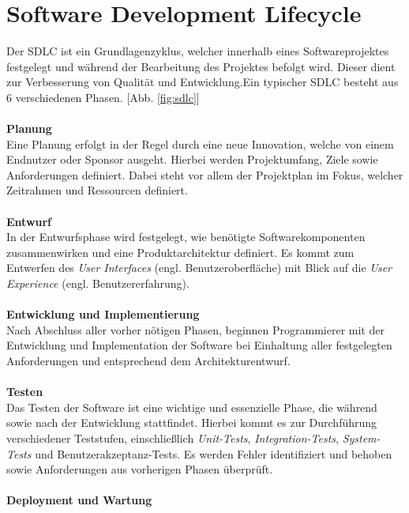 \section{Software Development Lifecycle}
Der SDLC ist ein Grundlagenzyklus, welcher innerhalb eines Softwareprojektes festgelegt und während der Bearbeitung des Projektes befolgt wird. \cite*{SoftwareDevelopmentLife} Dieser dient zur Verbesserung von Qualität und Entwicklung.Ein typischer SDLC besteht aus 6 verschiedenen Phasen. [Abb. \ref{fig:sdlc}]\\\\
\textbf{Planung}\\[0.2cm]
Eine Planung erfolgt in der Regel durch eine neue Innovation, welche von einem Endnutzer oder Sponsor ausgeht. \cite*{tikySoftwareDevelopmentLife} Hierbei werden Projektumfang, Ziele sowie Anforderungen definiert. Dabei steht vor allem der Projektplan im Fokus, welcher Zeitrahmen und Ressourcen definiert. \cite*{hossainSoftwareDevelopmentLife2023}\\\\
\textbf{Entwurf}\\[0.2cm]
In der Entwurfsphase wird festgelegt, wie benötigte Softwarekomponenten zusammenwirken und eine Produktarchitektur definiert. Es kommt zum Entwerfen des \textit{User Interfaces} (engl. Benutzeroberfläche) mit Blick auf die \textit{User Experience} (engl. Benutzererfahrung). \cite*{hossainSoftwareDevelopmentLife2023}\\\\
\textbf{Entwicklung und Implementierung}\\[0.2cm]
Nach Abschluss aller vorher nötigen Phasen, beginnen Programmierer mit der Entwicklung und Implementation der Software bei Einhaltung aller festgelegten Anforderungen und entsprechend dem Architekturentwurf. \cite*{tikySoftwareDevelopmentLife} \\\\
\textbf{Testen}\\[0.2cm]
Das Testen der Software ist eine wichtige und essenzielle Phase, die während sowie nach der Entwicklung stattfindet. Hierbei kommt es zur Durchführung verschiedener Teststufen, einschließlich \textit{Unit-Tests}, \textit{Integration-Tests}, \textit{System-Tests} und Benutzerakzeptanz-Tests. Es werden Fehler identifiziert und behoben sowie Anforderungen aus vorherigen Phasen überprüft. \cite*{hossainSoftwareDevelopmentLife2023}\\\\
\textbf{Deployment und Wartung}\\[0.2cm]
